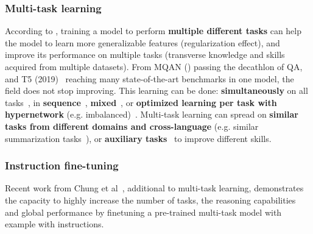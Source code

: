 \documentclass[acmsmall]{acmart}
\begin{document}
\subsubsection{Multi-task learning}\label{sec_supervisedtraining_multitask}
According to \citet{kalyanAMMUSSurveyTransformerbased2021}, training a model to perform \textbf{multiple different tasks} can help the model to learn more generalizable features (regularization effect), and improve its performance on multiple tasks (transverse knowledge and skills acquired from multiple datasets). From MQAN (\citet{mccannNaturalLanguageDecathlon2018}) passing the decathlon of QA, and T5 (2019)~\citep{raffelExploringLimitsTransfer2020} reaching many state-of-the-art benchmarks in one model, the field does not stop improving. This learning can be done: \textbf{simultaneously} on all tasks~\citep{liuMultiTaskDeepNeural2019}, in \textbf{sequence}~\citep{mahajanIdentificationSemanticallySimilar2020}, \textbf{mixed}~\citep{piergiovanniAnswerMeMultiTaskOpenVocabulary2022}, or \textbf{optimized learning per task with hypernetwork} (e.g. imbalanced)~\citep{jiPatientOutcomeZeroshot2023}. Multi-task learning can spread on \textbf{similar tasks from different domains and cross-language} (e.g. similar summarization tasks~\citep{goodwinZeroShotConditionalSummarization2020, baiCrossLingualAbstractiveSummarization2021}), or \textbf{auxiliary tasks}~\citep{jinHooksHeadlineLearning2020} to improve different skills.

\subsubsection{Instruction fine-tuning} \citep{chungScalingInstructionFinetunedLanguage2022, wangSelfInstructAligningLanguage2022, honovichUnnaturalInstructionsTuning2022}\label{sec_supervisedtraining_instructions}
Recent work from Chung et al~\citep{chungScalingInstructionFinetunedLanguage2022}, additional to multi-task learning, demonstrates the capacity to highly increase the number of tasks, the reasoning capabilities and global performance by finetuning a pre-trained multi-task model with example with instructions.
\end{document}

